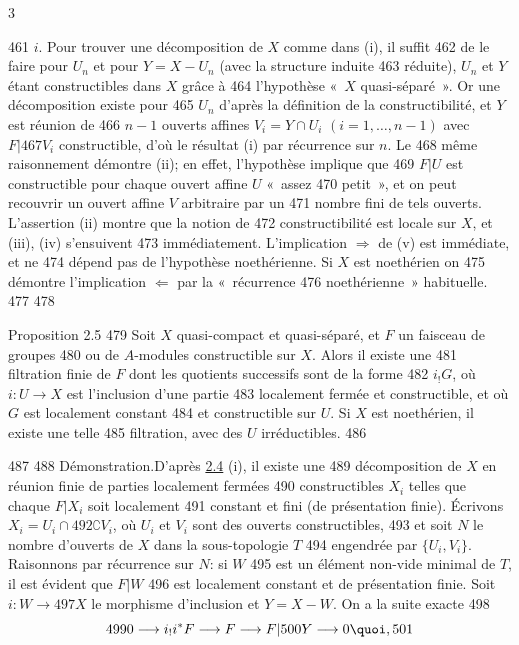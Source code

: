 3	\documentclass[10pt]{../fichiers-configuration-latex/smfart}
\begin{document}
   461	$i$. Pour trouver une décomposition de $X$ comme dans (i), il suffit
   462	de le faire pour $U_n$ et pour $Y=X-U_n$ (avec la structure induite
   463	réduite), $U_n$ et $Y$ étant constructibles dans $X$ grâce à
   464	l'hypothèse « $X$ quasi-séparé ». Or une décomposition existe pour
   465	$U_n$ d'après la définition de la constructibilité, et $Y$ est réunion de
   466	$n-1$ ouverts affines $V_i=Y\cap U_i$ $(i=1,\ldots,n-1)$ avec $F|
   467	V_i$ constructible, d'où le résultat (i) par récurrence sur $n$. Le
   468	même raisonnement démontre (ii); en effet, l'hypothèse implique que
   469	$F| U$ est constructible pour chaque ouvert affine $U$ « assez
   470	petit », et on peut recouvrir un ouvert affine $V$ arbitraire par un
   471	nombre fini de tels ouverts. L'assertion (ii) montre que la notion de
   472	constructibilité est locale sur $X$, et (iii), (iv) s'ensuivent
   473	immédiatement. L'implication $\Rightarrow$ de (v) est immédiate, et ne
   474	dépend pas de l'hypothèse noethérienne. Si $X$ est noethérien on
   475	démontre l'implication $\Leftarrow$ par la « récurrence
   476	noethérienne » habituelle.
   477	
   478	\begin{enonce*}{Proposition 2.5}
   479	Soit $X$ quasi-compact et quasi-séparé, et $F$ un faisceau de groupes
   480	ou de $A$-modules constructible sur $X$. Alors il existe une
   481	filtration finie de $F$ dont les quotients successifs sont de la forme
   482	$i_{!}G$, où $i:U\rightarrow X$ est l'inclusion d'une partie
   483	localement fermée et constructible, et où $G$ est localement constant
   484	et constructible sur $U$. Si $X$ est noethérien, il existe une telle
   485	filtration, avec des $U$ irréductibles.
   486	\end{enonce*}
   487	
   488	Démonstration.\pageoriginale D'après \hyperref[IX.prop2.4]{2.4} (i), il existe une
   489	décomposition de $X$ en réunion finie de parties localement fermées
   490	constructibles $X_i$ telles que chaque $F|X_i$ soit localement
   491	constant et fini (\resp de présentation finie). Écrivons $X_i=U_i\cap
   492	\complement V_i$, où $U_i$ et $V_i$ sont des ouverts constructibles,
   493	et soit $N$ le nombre d'ouverts de $X$ dans la sous-topologie $T$
   494	engendrée par $\{U_i,V_i\}$. Raisonnons par récurrence sur $N$: si $W$
   495	est un élément non-vide minimal de $T$, il est évident que $F|W$
   496	est localement constant et de présentation finie. Soit $i:W\rightarrow
   497	X$ le morphisme d'inclusion et $Y=X-W$. On a la suite exacte
   498	$$
   499	0\longrightarrow i_{!}i^{\ast}F\longrightarrow F\longrightarrow F|
   500	Y\longrightarrow 0{\quoi},
   501	$$
\end{document}

